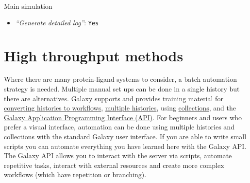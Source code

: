 \documentclass[twocolumn]{bmcart}%
\providecommand{\tightlist}{%
  \setlength{\itemsep}{0pt}\setlength{\parskip}{0pt}}
\begin{document}
\begin{handson_box_colour}{Main simulation}
\begin{itemize}
\begin{itemize}
      \begin{itemize}
      \tightlist
      \item
        \emph{``Temperature /K''}: \texttt{300}
      \item
        \emph{``Step length in ps''}: \texttt{0.001}
      \item
        \emph{``Number of steps that elapse between saving data points
        (velocities, forces, energies)''}: \texttt{1000}
      \item
        \emph{``Number of steps for the simulation''}: \texttt{1000000}
      \end{itemize}
    \end{itemize}
  \item
    \emph{``Generate detailed log''}: \texttt{Yes}
  \end{itemize}

\end{handson_box_colour}

\hypertarget{optional-automating-high-throughput-calculations}{%
\section*{High throughput methods}\label{optional-automating-high-throughput-calculations}}

Where there are many protein-ligand systems to consider, a batch automation strategy is needed. Multiple manual set ups can be done in a single history but there are alternatives. Galaxy supports and provides training material for \href{https://galaxyproject.github.io/training-material/topics/galaxy-ui/tutorials/history-to-workflow/tutorial.html}{converting histories to workflows}, \href{https://galaxyproject.github.io/training-material/topics/galaxy-ui/tutorials/history/tutorial.html}{multiple histories}, using \href{https://galaxyproject.github.io/training-material/topics/galaxy-data-manipulation/tutorials/collections/tutorial.html}{collections}, and the \href{https://training.galaxyproject.org/training-material/topics/dev/tutorials/bioblend-api/slides.html}{Galaxy Application Programming Interface (API)}. For beginners and users who prefer a visual interface, automation can be done using multiple histories and collections with the standard Galaxy user interface. If you are able to write small scripts you can automate everything you have learned here with the Galaxy API. The Galaxy API allows you to interact with the server via scripts, automate repetitive tasks, interact with external resources and create more complex workflows (which have repetition or branching).
\end{document}
